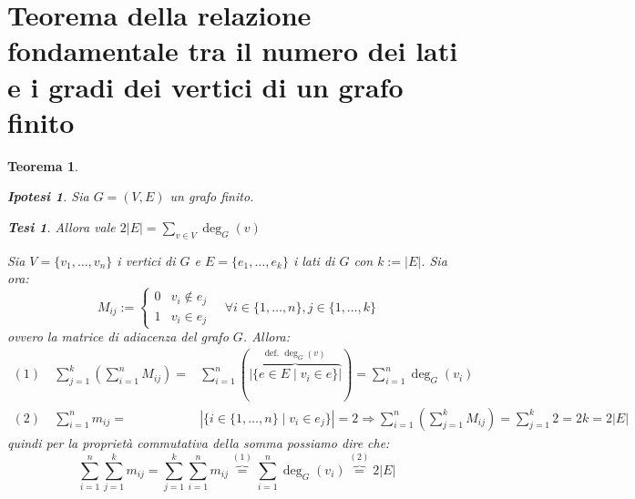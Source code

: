 \documentclass{article}
\makeatletter
\renewenvironment{proof}[1][\proofname]{\par
    \pushQED{\qed}%
    \normalfont \topsep6\p@\@plus6\p@\relax
    \trivlist
    \item\relax
    {\itshape
    #1\@addpunct{.}}\hspace\labelsep\ignorespaces
    }{%
    \popQED\endtrivlist\@endpefalse
}
\newtheorem{theorem}{Teorema}[part]
\newtheorem{ipothesis}[lemma]{Ipotesi}
\newtheorem{thesis}[lemma]{Tesi}
\theoremstyle{definition}
\makeatother
\begin{document}
    \section{Teorema della relazione fondamentale tra il numero dei lati e i gradi dei vertici di un grafo finito}
        \begin{theorem}
            \begin{ipothesis}
                Sia \(G=(V,E)\) un grafo finito.
            \end{ipothesis}
            \begin{thesis}
                Allora vale \(2|E|=\sum_{v\in V}\deg_G(v)\)
            \end{thesis}
            \begin{proof}
                Sia \(V=\{v_1,\ldots,v_n\}\) i vertici di \(G\) e \(E=\{e_1,\ldots,e_k\}\) i lati di \(G\) con \(k:=|E|\).
                Sia ora:\[
                    M_{ij}:=\begin{cases}
                        0& v_i\notin e_j\\
                        1& v_i\in e_j
                    \end{cases}\quad \forall i\in\{1,\ldots,n\},j\in\{1,\ldots,k\}
                \] ovvero la matrice di adiacenza del grafo \(G\).
                Allora:
                \[
                    \begin{aligned}
                        (1)\quad \sum_{j=1}^k\left(\sum_{i=1}^n M_{ij}\right)=&\sum_{i=1}^n\left(\overbrace{\left|\{e\in E\mid v_i\in e\}\right|}^{\text{def. }\deg_G(v)}\right)=\sum_{i=1}^n\deg_G(v_i)\\
                        (2)\quad \sum_{i=1}^n m_{ij}=&\left|\{ i\in \{1,\ldots,n\}\mid v_i\in e_j\}\right|=2\Rightarrow \sum_{i=1}^n\left(\sum_{j=1}^k M_{ij}\right)=\sum_{j=1}^k 2=2k=2|E|
                    \end{aligned}
                \]
                quindi per la proprietà commutativa della somma possiamo dire che:
                \[
                    \sum_{i=1}^n\sum_{j=1}^k m_{ij} =\sum_{j=1}^k\sum_{i=1}^n m_{ij}\overbrace{=}^{(1)}\sum_{i=1}^n\deg_G(v_i)\overbrace=^{(2)}2|E|
                \]
                \pushQED{}
            \end{proof}
            \raggedleft{{\ensuremath{\blacksquare}}}
        \end{theorem}
\end{document}
